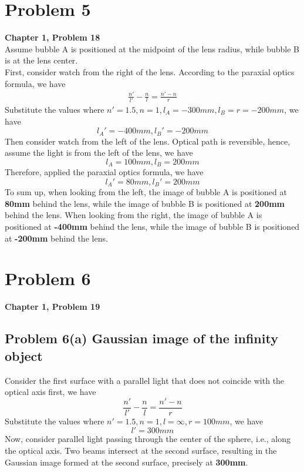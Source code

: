 \documentclass{article}
\begin{document}
\section{Problem 5}
\textbf{Chapter 1, Problem 18}\\
Assume bubble A is positioned at the midpoint of the lens radius, while bubble B is at the lens center.\\
First, consider watch from the right of the lens. According to the paraxial optics formula, we have
\begin{align}
    \frac{n'}{l'}-\frac{n}{l}=\frac{n'-n}{r}
\end{align}
Substitute the values where $n'=1.5, n=1, l_A=-300mm, l_B= r=-200mm$, we have
\begin{equation}
    \boxed{l_A'= -400mm, l_B' = -200mm}
\end{equation}
Then consider watch from the left of the lens. Optical path is reversible, hence, assume the light is from the left of the lens, we have
\begin{equation}
    l_A=100mm, l_B=200mm
\end{equation}
Therefore, applied the paraxial optics formula, we have
\begin{equation}
    \boxed{l_A'= 80mm, l_B'=200mm}
\end{equation}
To sum up, when looking from the left, the image of bubble A is positioned at \textbf{80mm} behind the lens, while the image of bubble B is positioned at \textbf{200mm} behind the lens. When looking from the right, the image of bubble A is positioned at \textbf{-400mm} behind the lens, while the image of bubble B is positioned at \textbf{-200mm} behind the lens.\\

\section{Problem 6}
\textbf{Chapter 1, Problem 19}\\

\subsection{Problem 6(a) Gaussian image of the infinity object}

Consider the first surface with a parallel light that does not coincide with the optical axis first, we have
\begin{equation}
    \frac{n'}{l'}-\frac{n}{l}=\frac{n'-n}{r}
\end{equation}
Substitute the values where $n'=1.5, n=1, l=\infty, r=100mm$, we have
\begin{equation}
    \boxed{l' = 300mm}
\end{equation}
Now, consider parallel light passing through the center of the sphere, i.e., along the optical axis. Two beams intersect at the second surface, resulting in the Gaussian image formed at the second surface, precisely at \textbf{300mm}.
\end{document}

